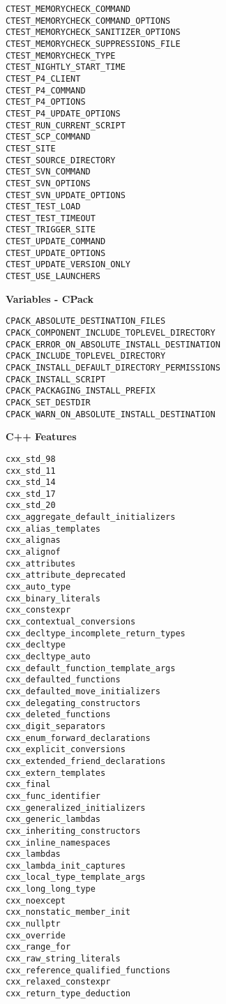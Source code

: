 \documentclass{article}
\begin{document}
\hfill\vline\hfill
\begin{minipage}[t]{0.18\linewidth}
\begin{verbatim}
CTEST_MEMORYCHECK_COMMAND
CTEST_MEMORYCHECK_COMMAND_OPTIONS
CTEST_MEMORYCHECK_SANITIZER_OPTIONS
CTEST_MEMORYCHECK_SUPPRESSIONS_FILE
CTEST_MEMORYCHECK_TYPE
CTEST_NIGHTLY_START_TIME
CTEST_P4_CLIENT
CTEST_P4_COMMAND
CTEST_P4_OPTIONS
CTEST_P4_UPDATE_OPTIONS
CTEST_RUN_CURRENT_SCRIPT
CTEST_SCP_COMMAND
CTEST_SITE
CTEST_SOURCE_DIRECTORY
CTEST_SVN_COMMAND
CTEST_SVN_OPTIONS
CTEST_SVN_UPDATE_OPTIONS
CTEST_TEST_LOAD
CTEST_TEST_TIMEOUT
CTEST_TRIGGER_SITE
CTEST_UPDATE_COMMAND
CTEST_UPDATE_OPTIONS
CTEST_UPDATE_VERSION_ONLY
CTEST_USE_LAUNCHERS
\end{verbatim}

\textbf{Variables - CPack}
\begin{verbatim}
CPACK_ABSOLUTE_DESTINATION_FILES
CPACK_COMPONENT_INCLUDE_TOPLEVEL_DIRECTORY
CPACK_ERROR_ON_ABSOLUTE_INSTALL_DESTINATION
CPACK_INCLUDE_TOPLEVEL_DIRECTORY
CPACK_INSTALL_DEFAULT_DIRECTORY_PERMISSIONS
CPACK_INSTALL_SCRIPT
CPACK_PACKAGING_INSTALL_PREFIX
CPACK_SET_DESTDIR
CPACK_WARN_ON_ABSOLUTE_INSTALL_DESTINATION
\end{verbatim}

\textbf{C++ Features}
\begin{verbatim}
cxx_std_98
cxx_std_11
cxx_std_14
cxx_std_17
cxx_std_20
cxx_aggregate_default_initializers
cxx_alias_templates
cxx_alignas
cxx_alignof
cxx_attributes
cxx_attribute_deprecated
cxx_auto_type
cxx_binary_literals
cxx_constexpr
cxx_contextual_conversions
cxx_decltype_incomplete_return_types
cxx_decltype
cxx_decltype_auto
cxx_default_function_template_args
cxx_defaulted_functions
cxx_defaulted_move_initializers
cxx_delegating_constructors
cxx_deleted_functions
cxx_digit_separators
cxx_enum_forward_declarations
cxx_explicit_conversions
cxx_extended_friend_declarations
cxx_extern_templates
cxx_final
cxx_func_identifier
cxx_generalized_initializers
cxx_generic_lambdas
cxx_inheriting_constructors
cxx_inline_namespaces
cxx_lambdas
cxx_lambda_init_captures
cxx_local_type_template_args
cxx_long_long_type
cxx_noexcept
cxx_nonstatic_member_init
cxx_nullptr
cxx_override
cxx_range_for
cxx_raw_string_literals
cxx_reference_qualified_functions
cxx_relaxed_constexpr
cxx_return_type_deduction
\end{verbatim}
\end{minipage}
\hfill\vline\hfill
\end{document}
